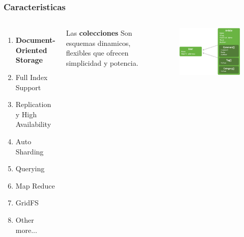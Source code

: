 \documentclass{beamer}
\begin{document}
\begin{frame}
\frametitle{Caracteristicas}
\begin{columns}[c] %

\begin{enumerate}
\item \textbf{Document-Oriented Storage}
\item Full Index Support
\item Replication y High Availability
\item Auto Sharding
\item Querying
\item Map Reduce
\item GridFS
\item Other more...
\end{enumerate}

Las \textbf{colecciones} Son esquemas dinamicos, flexibles que ofrecen simplicidad y potencia.
\begin{figure}
\includegraphics[width=0.9\linewidth]{document.png}
\end{figure}
\end{columns}
\end{frame}
\end{document}
